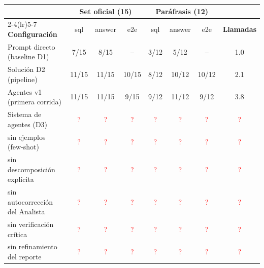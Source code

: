\begin{tabular}{@{}lccccccc@{}}
\toprule
& \multicolumn{3}{c}{\textbf{Set oficial (15)}} & \multicolumn{3}{c}{\textbf{Paráfrasis (12)}} & \\
\cmidrule(lr){2-4}\cmidrule(lr){5-7}
\textbf{Configuración} & sql & answer & e2e & sql & answer & e2e & \textbf{Llamadas} \\
\midrule
Prompt directo (baseline D1) & 7/15 & 8/15 & -- & 3/12 & 5/12 & -- & 1.0 \\
Solución D2 (pipeline) & 11/15 & 11/15 & 10/15 & 8/12 & 10/12 & 10/12 & 2.1 \\
\addlinespace
Agentes v1 (primera corrida) & 11/15 & 11/15 & 9/15 & 9/12 & 11/12 & 9/12 & 3.8 \\
\addlinespace
Sistema de agentes (D3) & \textcolor{red}{?} & \textcolor{red}{?} & \textcolor{red}{?} & \textcolor{red}{?} & \textcolor{red}{?} & \textcolor{red}{?} & \textcolor{red}{?} \\
\addlinespace
\quad sin ejemplos (few-shot) & \textcolor{red}{?} & \textcolor{red}{?} & \textcolor{red}{?} & \textcolor{red}{?} & \textcolor{red}{?} & \textcolor{red}{?} & \textcolor{red}{?} \\
\quad sin descomposición explícita & \textcolor{red}{?} & \textcolor{red}{?} & \textcolor{red}{?} & \textcolor{red}{?} & \textcolor{red}{?} & \textcolor{red}{?} & \textcolor{red}{?} \\
\quad sin autocorrección del Analista & \textcolor{red}{?} & \textcolor{red}{?} & \textcolor{red}{?} & \textcolor{red}{?} & \textcolor{red}{?} & \textcolor{red}{?} & \textcolor{red}{?} \\
\quad sin verificación crítica & \textcolor{red}{?} & \textcolor{red}{?} & \textcolor{red}{?} & \textcolor{red}{?} & \textcolor{red}{?} & \textcolor{red}{?} & \textcolor{red}{?} \\
\quad sin refinamiento del reporte & \textcolor{red}{?} & \textcolor{red}{?} & \textcolor{red}{?} & \textcolor{red}{?} & \textcolor{red}{?} & \textcolor{red}{?} & \textcolor{red}{?} \\
\bottomrule
\end{tabular}
